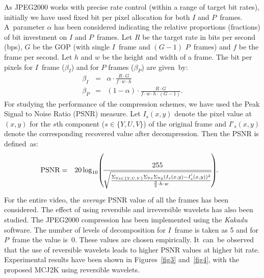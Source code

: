 \documentclass{doublecol-new}
\theoremstyle{TH}{
\newtheorem{lemma}{Lemma}[section]
\newtheorem{theorem}{Theorem}
\newtheorem{corrolary}{Corrolary}
\newtheorem{conjecture}[lemma]{Conjecture}
\newtheorem{proposition}[lemma]{Proposition}
\newtheorem{claim}[lemma]{Claim}
\newtheorem{stheorem}[lemma]{Wrong Theorem}
}
\theoremstyle{THrm}{
\newtheorem{definition}{Definition}[section]
\newtheorem{question}{Question}[section]
\newtheorem{remark}{Remark}[section]
\newtheorem{scheme}{Scheme}
}
\theoremstyle{THhit}{
\newtheorem{case}{Case}[section]
}
\begin{document}
\noindent As JPEG2000 works with precise rate control (within a range of
target bit rates), initially we have used fixed bit per pixel allocation
for both $I$ and $P$~frames. A~parameter $\alpha$ has been considered
indicating the relative proportions (fractions) of bit investment on $I$
and $P$~frames. Let $R$ be the target rate in bits  per second (bps), $G$
be the GOP (with single $I$~frame and $(G-1)$ $P$~frames) and $f$ be the
frame per second. Let $h$ and $w$ be the height and width of a frame. The
bit per pixels for $I$~frame ($\beta_I$) and for $P$ frames ($\beta_P$)
are given~by:
\begin{eqnarray}
\beta_I&=&\alpha\cdot \frac{R\cdot G}{f\cdot w\cdot h}\label{eqn_bpp_I}\\
\beta_P&=&(1-\alpha)\cdot \frac{R\cdot G}{f\cdot w\cdot h\cdot
(G-1)}.\label{eqn_bpp_P}
\end{eqnarray}
For studying the performance of the compression schemes, we have used the
Peak Signal to Noise Ratio (PSNR) measure. Let $I_s(x,y)$ denote the pixel
value at $(x,y)$ for the $s$th component ($s \in \{Y,U,V\}$) of the
original frame and $I'_s(x,y)$ denote the corresponding recovered value
after decompression. Then the PSNR is defined~as:
\begin{eqnarray}
\hspace*{-9pt}
\hbox{PSNR}&=&20\log_{10}\kern-2pt\left(\kern-2pt\frac{255}{\sqrt{\frac{\Sigma_{\forall
s \in \{Y,U,V\}}\Sigma_{\forall x}\Sigma_{\forall
y}(I_s(x,y)-I^{'}_s(x,y))^2}{\frac{3}{2}\cdot h\cdot
w}}}\kern-2pt\right)\kern-3pt.\nonumber\\[-2pt] \label{eqn_psnr}
\end{eqnarray}

\vspace*{-4pt} \noindent For the entire video, the {\it average} PSNR
value of all the frames has been considered. The effect of using
reversible and irreversible wavelets has also been studied. The JPEG2000
compression has been implemented using the {\it
Kakadu} software. The number of
levels of decomposition for $I$~frame is taken as 5 and for $P$~frame the
value is~0. These values are chosen empirically. It~can~be observed that
the use of reversible wavelets leads to higher PSNR values at higher bit
rate. Experimental results have been shown in Figures~\ref{fig3}
and~\ref{fig4}, with the proposed MCJ2K using reversible wavelets.
\end{document}
